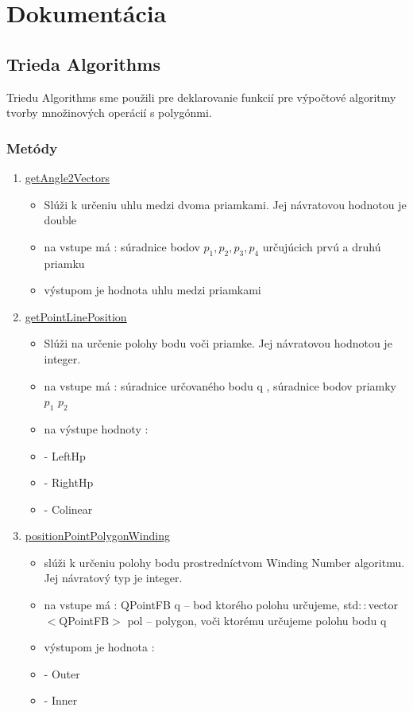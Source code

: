 \documentclass[12pt]{article}
\begin{document}
\section{Dokumentácia}
\subsection{Trieda Algorithms}
Triedu Algorithms sme použili pre deklarovanie funkcií pre výpočtové algoritmy tvorby množinových operácií s polygónmi.

\subsubsection{Metódy}

\begin{enumerate}
\item[] \underline{getAngle2Vectors}
\begin{itemize}
\item Slúži k určeniu uhlu medzi dvoma priamkami. Jej návratovou hodnotou je double
\item na vstupe má : súradnice bodov $p_1, p_2, p_3, p_4$ určujúcich prvú a druhú priamku
\item výstupom je hodnota uhlu medzi priamkami 
\end{itemize}

\item[] \underline{getPointLinePosition}
\begin{itemize}
\item Slúži na určenie polohy bodu voči priamke. Jej návratovou hodnotou je integer.
\item na vstupe má : súradnice určovaného bodu q , súradnice bodov priamky $p_1$ $p_2$
\item na výstupe hodnoty :
\item[] - LeftHp
\item[] - RightHp
\item[] - Colinear
\end{itemize}

\item[] \underline{positionPointPolygonWinding}
\begin{itemize}
\item slúži k určeniu polohy bodu prostredníctvom Winding Number algoritmu. Jej návratový typ je integer.
\item na vstupe má : QPointFB q – bod ktorého polohu určujeme, std$::$vector$<$QPointFB$>$ pol – polygon, voči ktorému určujeme polohu bodu q
\item výstupom je hodnota :
\item[] - Outer
\item[] - Inner
\end{itemize}


\end{enumerate}
\end{document}
